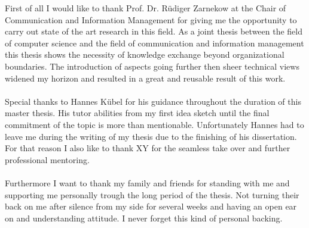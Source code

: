 \thispagestyle{empty}
\vspace*{3cm}

\vspace*{1cm}
\noindent 
First of all I would like to thank Prof. Dr. Rüdiger Zarnekow at the Chair of Communication and Information Management for giving me the opportunity to carry out state of the art research in this field. As a joint thesis between the field of computer science and the field of communication and information management this thesis shows the necessity of knowledge exchange beyond organizational boundaries. The introduction of aspects going further then sheer technical views widened my horizon and resulted in a great and reusable result of this work. 
\\
\\
Special thanks to Hannes Kübel for his guidance throughout the duration of this master thesis. His tutor abilities from my first idea sketch until the final commitment of the topic is more than mentionable. Unfortunately Hannes had to leave me during the writing of my thesis due to the finishing of his dissertation. For that reason I also like to thank XY for the seamless take over and further professional mentoring.
\\
\\
Furthermore I want to thank my family and friends for standing with me and supporting me personally trough the long period of the thesis. Not turning their back on me after silence from my side for several weeks and having an open ear on and understanding attitude. I never forget this kind of personal backing.